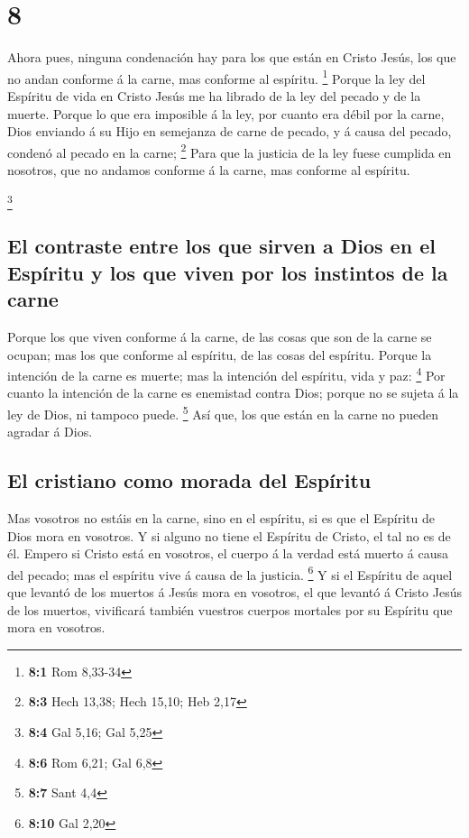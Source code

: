\hypertarget{section-7}{%
\section{8}\label{section-7}}

 Ahora pues, ninguna condenación hay para los que están en
Cristo Jesús, los que no andan conforme á la carne, mas conforme al
espíritu. \footnote{\textbf{8:1} Rom 8,33-34}  Porque la ley
del Espíritu de vida en Cristo Jesús me ha librado de la ley del pecado
y de la muerte.  Porque lo que era imposible á la ley, por
cuanto era débil por la carne, Dios enviando á su Hijo en semejanza de
carne de pecado, y á causa del pecado, condenó al pecado en la carne;
\footnote{\textbf{8:3} Hech 13,38; Hech 15,10; Heb 2,17} 
Para que la justicia de la ley fuese cumplida en nosotros, que no
andamos conforme á la carne, mas conforme al espíritu.

\footnote{\textbf{8:4} Gal 5,16; Gal 5,25}

\hypertarget{el-contraste-entre-los-que-sirven-a-dios-en-el-espuxedritu-y-los-que-viven-por-los-instintos-de-la-carne}{%
\subsection{El contraste entre los que sirven a Dios en el Espíritu y
los que viven por los instintos de la
carne}\label{el-contraste-entre-los-que-sirven-a-dios-en-el-espuxedritu-y-los-que-viven-por-los-instintos-de-la-carne}}

 Porque los que viven conforme á la carne, de las cosas que
son de la carne se ocupan; mas los que conforme al espíritu, de las
cosas del espíritu.  Porque la intención de la carne es
muerte; mas la intención del espíritu, vida y paz: \footnote{\textbf{8:6}
  Rom 6,21; Gal 6,8}  Por cuanto la intención de la carne es
enemistad contra Dios; porque no se sujeta á la ley de Dios, ni tampoco
puede. \footnote{\textbf{8:7} Sant 4,4}  Así que, los que
están en la carne no pueden agradar á Dios.

\hypertarget{el-cristiano-como-morada-del-espuxedritu}{%
\subsection{El cristiano como morada del
Espíritu}\label{el-cristiano-como-morada-del-espuxedritu}}

 Mas vosotros no estáis en la carne, sino en el espíritu, si
es que el Espíritu de Dios mora en vosotros. Y si alguno no tiene el
Espíritu de Cristo, el tal no es de él.  Empero si Cristo
está en vosotros, el cuerpo á la verdad está muerto á causa del pecado;
mas el espíritu vive á causa de la justicia. \footnote{\textbf{8:10} Gal
  2,20}  Y si el Espíritu de aquel que levantó de los
muertos á Jesús mora en vosotros, el que levantó á Cristo Jesús de los
muertos, vivificará también vuestros cuerpos mortales por su Espíritu
que mora en vosotros.

